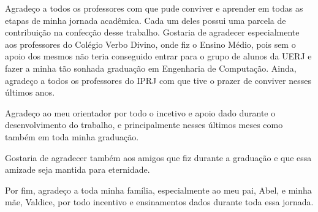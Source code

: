 
\begin{agradecimentos}

Agradeço a todos os professores com que pude conviver e aprender em todas as etapas de minha jornada acadêmica. Cada um deles possui uma parcela de contribuição na confecção desse trabalho. Gostaria de agradecer especialmente aos professores do Colégio Verbo Divino, onde fiz o Ensino Médio, pois sem o apoio dos mesmos não teria conseguido entrar para o grupo de alunos da UERJ e fazer a minha tão sonhada graduação em Engenharia de Computação. Ainda, agradeço a todos os professores do IPRJ com que tive o prazer de conviver nesses últimos anos.

Agradeço ao meu orientador por todo o incetivo e apoio dado durante o desenvolvimento do trabalho, e principalmente nesses últimos meses como também em toda minha graduação.

Gostaria de agradecer também aos amigos que fiz durante a graduação e que essa amizade seja mantida para eternidade.

Por fim, agradeço a toda minha família, especialmente ao meu pai, Abel, e minha mãe, Valdice, por todo incentivo e ensinamentos dados durante toda essa jornada.

\end{agradecimentos}